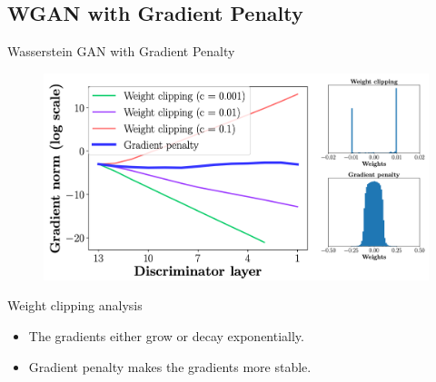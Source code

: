 \subsection{WGAN with Gradient Penalty}
\begin{frame}{Wasserstein GAN with Gradient Penalty}
	\vspace{-0.2cm}
	\begin{figure}
		\centering
		\includegraphics[width=0.9\linewidth]{figs/wgan_gp_weights}
	\end{figure}
	\vspace{-0.2cm} 
	
	\begin{block}{Weight clipping analysis}
		\begin{itemize}
			\item The gradients either grow or decay exponentially.
			\item Gradient penalty makes the gradients more stable.
		\end{itemize}
	\end{block}
\end{frame}
